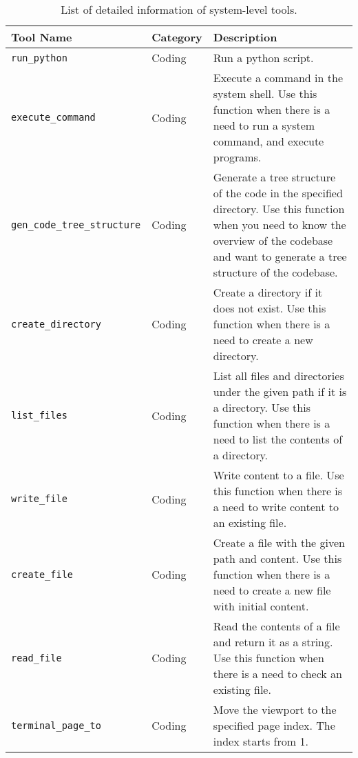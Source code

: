 \begin{longtable}{p{4.8cm}|p{1.5cm}|p{6.5cm}}
\caption{List of detailed information of system-level tools.}
\label{tab:tool_1}\\
\toprule
\textbf{Tool Name} & \textbf{Category} & \textbf{Description}     \\
 \midrule

\texttt{run\_python} & Coding & Run a python script. \\
\midrule
\texttt{execute\_command} & Coding & Execute a command in the system shell. Use this function when there is a need to run a system command, and execute programs. \\
\midrule
\texttt{gen\_code\_tree\_structure} & Coding & Generate a tree structure of the code in the specified directory. Use this function when you need to know the overview of the codebase and want to generate a tree structure of the codebase. \\
\midrule
\texttt{create\_directory} & Coding & Create a directory if it does not exist. Use this function when there is a need to create a new directory. \\
\midrule
\texttt{list\_files} & Coding & List all files and directories under the given path if it is a directory. Use this function when there is a need to list the contents of a directory. \\
\midrule
\texttt{write\_file} & Coding & Write content to a file. Use this function when there is a need to write content to an existing file. \\
\midrule
\texttt{create\_file} & Coding & Create a file with the given path and content. Use this function when there is a need to create a new file with initial content. \\
\midrule
\texttt{read\_file} & Coding & Read the contents of a file and return it as a string. Use this function when there is a need to check an existing file. \\
\midrule
\texttt{terminal\_page\_to} & Coding & Move the viewport to the specified page index. The index starts from 1. 


\end{longtable}
